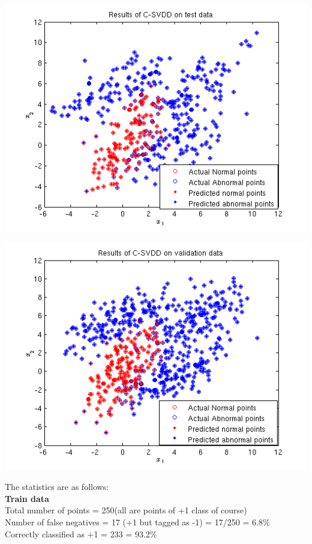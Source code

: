 \documentclass{article}
\begin{document}
\begin{center}
\includegraphics[scale=.8]{SVDD/c/test_plot}
\end{center}
\begin{center}
\includegraphics[scale=.8]{SVDD/c/val_plot}
\end{center}
The statistics are as follows:\\[5pt]
\textbf{Train data\\}
Total number of points = 250(all are points of +1 class of course) \\
Number of false negatives = 17 (+1 but tagged as -1) = 17/250 = 6.8\% \\  
Correctly classified as +1 = 233 = 93.2\%\\[10pt]
\end{document}
